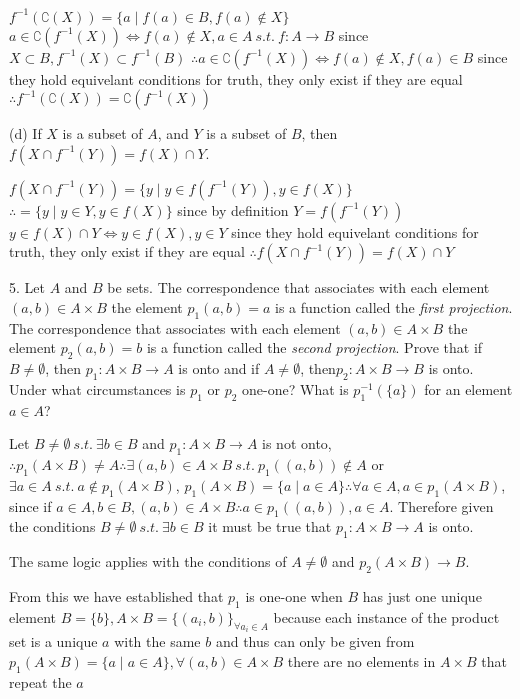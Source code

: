 $f^{-1}(\complement(X)) = \{ a \mid f(a) \in B, f(a) \not \in X\}$
$a \in \complement(f^{-1}(X)) \iff f(a) \not \in X, a \in A\ s.t.\ f:A \rightarrow B$ since $X \subset B, f^{-1}(X) \subset f^{-1}(B)$
$\therefore a \in \complement(f^{-1}(X)) \iff f(a) \not \in X, f(a) \in B$
since they hold equivelant conditions for truth, they only exist if they are equal
$\therefore f^{-1}(\complement(X)) = \complement(f^{-1}(X))$

(d) If $X$ is a subset of $A$, and $Y$ is a subset of $B$, then $f(X \cap f^{-1}(Y)) = f(X) \cap Y$.

$f(X \cap f^{-1}(Y)) = \{ y \mid y \in f(f^{-1}(Y)), y \in f(X)\}$
$\therefore = \{y \mid y \in Y, y \in f(X)\}$ since by definition $Y =  f(f^{-1}(Y))$
$y \in f(X)\cap Y \iff y \in f(X), y \in Y$
since they hold equivelant conditions for truth, they only exist if they are equal
$\therefore f(X \cap f^{-1}(Y)) = f(X) \cap Y$

5. Let $A$ and $B$ be sets. The correspondence that associates with each element $(a, b) \in A \times B$ the element $p_{1}(a, b) = a$ is a function called the \textit{first projection}. The correspondence that associates with each element $(a, b) \in A \times B$ the element $p_{2}(a, b) = b$ is a function called the \textit{second projection}. Prove that if $B \not = \emptyset$, then $p_{1}:A \times B \rightarrow A$ is onto and if $A \not = \emptyset$, then$p_{2}:A \times B  \rightarrow B$ is onto. Under what circumstances is $p_{1}$ or $p_{2}$ one-one? What is $p_{1}^{-1}(\{a\})$ for an element $a \in A$?

Let $B \not = \emptyset \ s.t.\ \exists b \in B $ and $p_{1}:A \times B \rightarrow A$ is not onto,
$\therefore p_{1}(A\times B) \not = A \therefore \exists (a, b) \in A \times B\ s.t.\ p_{1}((a, b)) \not \in A$ or $\exists a \in A\ s.t.\ a\not \in p_{1}(A\times B)$,
$p_{1}(A \times B) = \{ a \mid  a \in A\} \therefore \forall a \in A, a \in p_{1}(A \times B)$,
since if $a \in A, b \in B, (a, b) \in A \times B \therefore a \in p_{1}((a, b)), a \in A$.
Therefore given the conditions $B \not = \emptyset \ s.t.\ \exists b \in B $ it must be true that $p_{1}:A \times B \rightarrow A$ is onto.

The same logic applies with the conditions of $A \not = \emptyset$ and $p_{2}(A \times B) \rightarrow B$.

From this we have established that $p_{1}$ is one-one when $B$ has just one unique element $B = \{ b\}, A \times B = \{ (a_{i}, b)\}_{\forall a_{i} \in A}$ because each instance of the product set is a unique $a$ with the same $b$ and thus can only be given from $p_{1}(A \times B) = \{ a \mid  a \in A\}, \forall (a, b) \in A \times B$ there are no elements in $A \times B$ that repeat the $a$

